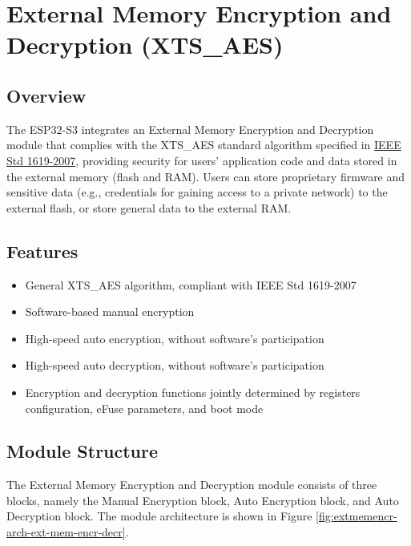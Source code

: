 \documentclass[main\_\_EN.tex]{subfiles}
\begin{document}

\ifglobal
\else
    {\let\clearpage\relax \listoftodos}
    \tableofcontents
\fi



\hypertarget{extmemencr}{}
\chapter{External Memory Encryption and Decryption (XTS\_AES)}
\label{mod:extmemencr}


\section{Overview}

The ESP32-S3 integrates an External Memory Encryption and Decryption module that complies with the XTS\_AES standard algorithm specified in \href{https://ieeexplore.ieee.org/document/4493450}{IEEE Std 1619-2007}, providing security for users' application code and data stored in the external memory (flash and RAM). Users can store proprietary firmware and sensitive data (e.g., credentials for gaining access to a private network) to the external flash, or store general data to the external RAM.

\section{Features}

\begin{itemize}
    \item General XTS\_AES algorithm, compliant with IEEE Std 1619-2007
    \item Software-based manual encryption
    \item High-speed auto encryption, without software's participation
    \item High-speed auto decryption, without software's participation
    \item Encryption and decryption functions jointly determined by registers configuration, eFuse parameters, and boot mode
\end{itemize}


\section{Module Structure}
The External Memory Encryption and Decryption module consists of three blocks, namely the Manual Encryption block, Auto Encryption block, and Auto Decryption block. The module architecture is shown in Figure \ref{fig:extmemencr-arch-ext-mem-encr-decr}.
\end{document}
